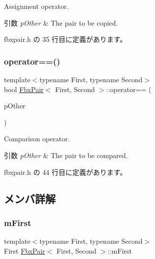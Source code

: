 Assignment operator. 
\begin{DoxyParams}{引数}
{\em p\+Other} & The pair to be copied. \\
\hline
\end{DoxyParams}


 fbxpair.\+h の 35 行目に定義があります。

\mbox{\label{class_fbx_pair_a9ada9f26dbcfd8e26b4e6df741436824}} 
\subsubsection{\texorpdfstring{operator==()}{operator==()}}
{\footnotesize\ttfamily template$<$typename First, typename Second$>$ \\
bool \hyperlink{class_fbx_pair}{Fbx\+Pair}$<$ First, Second $>$\+::operator== (\begin{DoxyParamCaption}\item[{const \hyperlink{class_fbx_pair}{Fbx\+Pair}$<$ First, Second $>$ \&}]{p\+Other }\end{DoxyParamCaption})\hspace{0.3cm}{\ttfamily [inline]}}

Comparison operator. 
\begin{DoxyParams}{引数}
{\em p\+Other} & The pair to be compared. \\
\hline
\end{DoxyParams}


 fbxpair.\+h の 44 行目に定義があります。



\subsection{メンバ詳解}
\mbox{\label{class_fbx_pair_ae4207e9014fead320362025388c70703}} 
\subsubsection{\texorpdfstring{m\+First}{mFirst}}
{\footnotesize\ttfamily template$<$typename First, typename Second$>$ \\
First \hyperlink{class_fbx_pair}{Fbx\+Pair}$<$ First, Second $>$\+::m\+First}



